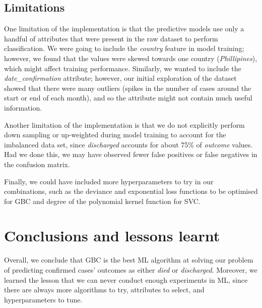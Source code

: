 \documentclass[twoside,11pt]{article}
\begin{document}
\subsection{Limitations}
One limitation of the implementation is that the predictive models use only a handful of attributes that were present in the raw dataset to perform classification. We were going to include the \emph{country} feature in model training; however, we found that the values were skewed towards one country (\emph{Phillipines}), which might affect training performance. Similarly, we wanted to include the \emph{date\_confirmation} attribute; however, our initial exploration of the dataset showed that there were many outliers (spikes in the number of cases around the start or end of each month), and so the attribute might not contain much useful information.

Another limitation of the implementation is that we do not explicitly perform down sampling or up-weighted during model training to account for the imbalanced data set, since \emph{discharged} accounts for about 75\% of \emph{outcome} values. Had we done this, we may have observed fewer false positives or false negatives in the confusion matrix.

Finally, we could have included more hyperparameters to try in our combinations, such as the deviance and exponential loss functions to be optimised for GBC and degree of the polynomial kernel function for SVC.

\section{Conclusions and lessons learnt}
Overall, we conclude that GBC is the best ML algorithm at solving our problem of predicting confirmed cases' outcomes as either \emph{died} or \emph{discharged}. Moreover, we learned the lesson that we can never conduct enough experiments in ML, since there are always more algorithms to try, attributes to select, and hyperparameters to tune.


\end{document}
